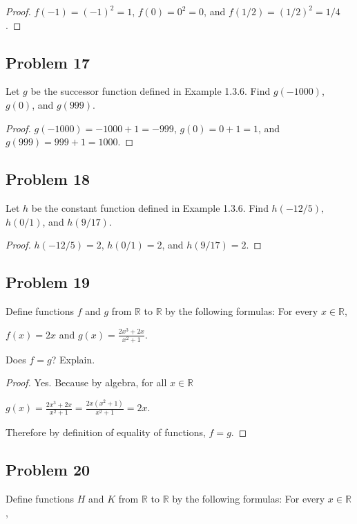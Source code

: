 \documentclass[14pt]{extarticle}
\newcommand{\dps}{\displaystyle}
\newcommand{\R}{\mathbb{R}}
\begin{document}
\begin{proof}
$f(-1) = (-1)^2 = 1$, $f(0) = 0^2 = 0$, and $f(1/2) = (1/2)^2 = 1/4$.
\end{proof}

\subsection{Problem 17}
Let $g$ be the successor function defined in Example 1.3.6.
Find $g(-1000)$, $g(0)$, and $g(999)$.

\begin{proof}
$g(-1000) = -1000 + 1 = -999$, $g(0) = 0 + 1 = 1$, and $g(999) = 999 + 1 = 1000$.
\end{proof}

\subsection{Problem 18}
Let $h$ be the constant function defined in Example 1.3.6.
Find $h(-12/5),$ $h(0/1)$, and $h(9/17)$.

\begin{proof}
$h(-12/5) = 2$, $h(0/1) = 2$, and $h(9/17) = 2$.
\end{proof}

\subsection{Problem 19}
Define functions $f$ and $g$ from $\R$ to $\R$ by the following formulas:
For every $x \in \R$,

\begin{center}
$f(x) = 2x$ and $\dps g(x) = \frac{2x^3 + 2x}{x^2 + 1}$.
\end{center}

Does $f = g$? Explain.

\begin{proof}
Yes. Because by algebra, for all $x \in \R$

$\dps g(x) = \frac{2x^3 + 2x}{x^2 + 1} = \frac{2x(x^2 + 1)}{x^2 + 1} = 2x$.

Therefore by definition of equality of functions, $f = g$.
\end{proof}

\subsection{Problem 20}
Define functions $H$ and $K$ from $\R$ to $\R$ by the following formulas:
For every $x \in \R$,
\end{document}
